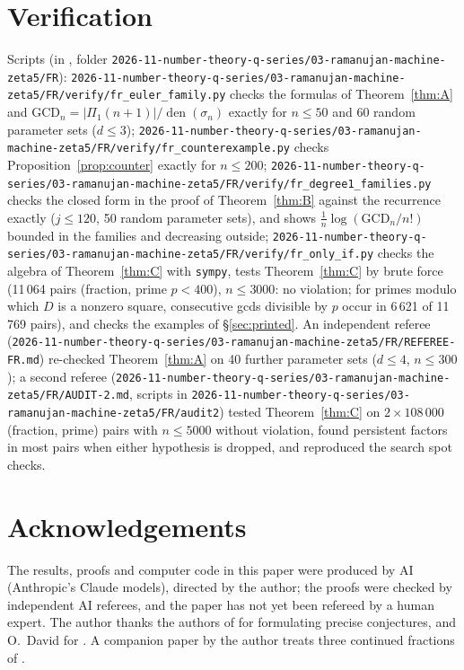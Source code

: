 \documentclass[11pt]{amsart}
\theoremstyle{definition}
\theoremstyle{remark}
\numberwithin{equation}{section}
\newcommand{\GCD}{\mathrm{GCD}}
\newcommand{\den}{\operatorname{den}}
\newcommand{\repo}{2026-11-number-theory-q-series/03-ramanujan-machine-zeta5}
\newcommand{\file}[1]{\nolinkurl{2026-11-number-theory-q-series/03-ramanujan-machine-zeta5/#1}}
\begin{document}
\section{Verification}\label{sec:num}
Scripts (in \cite{code}, folder \nolinkurl{\repo/FR}): \file{FR/verify/fr_euler_family.py} checks the formulas of Theorem~\ref{thm:A} and $\GCD_n=|\Pi_1(n+1)|/\den(\sigma_n)$ exactly for $n\le50$ and 60 random parameter sets ($d\le3$); \file{FR/verify/fr_counterexample.py} checks Proposition~\ref{prop:counter} exactly for $n\le200$; \file{FR/verify/fr_degree1_families.py} checks the closed form in the proof of Theorem~\ref{thm:B} against the recurrence exactly ($j\le120$, 50 random parameter sets), and shows $\frac1n\log(\GCD_n/n!)$ bounded in the families and decreasing outside; \file{FR/verify/fr_only_if.py} checks the algebra of Theorem~\ref{thm:C} with \texttt{sympy}, tests Theorem~\ref{thm:C} by brute force (11\,064 pairs (fraction, prime $p<400$), $n\le3000$: no violation; for primes modulo which $D$ is a nonzero square, consecutive gcds divisible by $p$ occur in 6\,621 of 11\,769 pairs), and checks the examples of \S\ref{sec:printed}. An independent referee (\file{FR/REFEREE-FR.md}) re-checked Theorem~\ref{thm:A} on 40 further parameter sets ($d\le4$, $n\le300$); a second referee (\file{FR/AUDIT-2.md}, scripts in \nolinkurl{\repo/FR/audit2}) tested Theorem~\ref{thm:C} on $2\times108\,000$ (fraction, prime) pairs with $n\le5000$ without violation, found persistent factors in most pairs when either hypothesis is dropped, and reproduced the search spot checks.

\section*{Acknowledgements}
The results, proofs and computer code in this paper were produced by AI (Anthropic's Claude models), directed by the author; the proofs were checked by independent AI referees, and the paper has not yet been refereed by a human expert. The author thanks the authors of \cite{BDNM} for formulating precise conjectures, and O.~David for \cite{Dav}. A companion paper by the author treats three continued fractions of \cite{EDCK} \cite{Sha2}.
\end{document}

